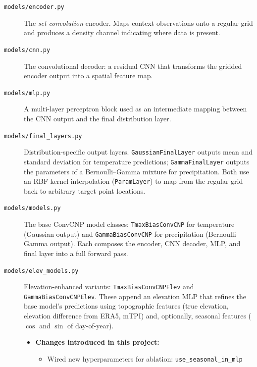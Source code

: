 \begin{description}

  \item[\texttt{models/encoder.py}] The \emph{set convolution} encoder. Maps context observations onto a regular grid and produces a density channel indicating where data is present.

  \item[\texttt{models/cnn.py}] The convolutional decoder: a residual CNN that transforms the gridded encoder output into a spatial feature map.

  \item[\texttt{models/mlp.py}] A multi-layer perceptron block used as an intermediate mapping between the CNN output and the final distribution layer.

  \item[\texttt{models/final\_layers.py}] Distribution-specific output layers.
  \texttt{GaussianFinalLayer} outputs mean and standard deviation for temperature predictions; \newline \texttt{GammaFinalLayer} outputs the parameters of a Bernoulli--Gamma mixture for precipitation.
  Both use an RBF kernel interpolation (\texttt{ParamLayer}) to map from the regular grid back to arbitrary target point locations.

  \item[\texttt{models/models.py}] The base ConvCNP model classes: \texttt{TmaxBias\-ConvCNP} for temperature (Gaussian output) and \texttt{GammaBias\-ConvCNP} for precipitation (Bernoulli--Gamma output).
  Each composes the encoder, CNN decoder, MLP, and final layer into a full forward pass.

  \item[\texttt{models/elev\_models.py}] Elevation-enhanced variants: \texttt{Tmax\-Bias\-ConvCNP\-Elev} and \texttt{Gamma\-Bias\-ConvCNP\-Elev}.
  These append an elevation MLP that refines the base model's predictions using topographic features (true elevation, elevation difference from ERA5, mTPI) and, optionally, seasonal features ($\cos$ and $\sin$ of day-of-year).
  \begin{itemize}
      \item[] \textbf{Changes introduced in this project:}
      \begin{itemize}
          \item Wired new hyperparameters for ablation: \texttt{use\_seasonal\_in\_mlp}
      \end{itemize}
  \end{itemize} 


\end{description}
